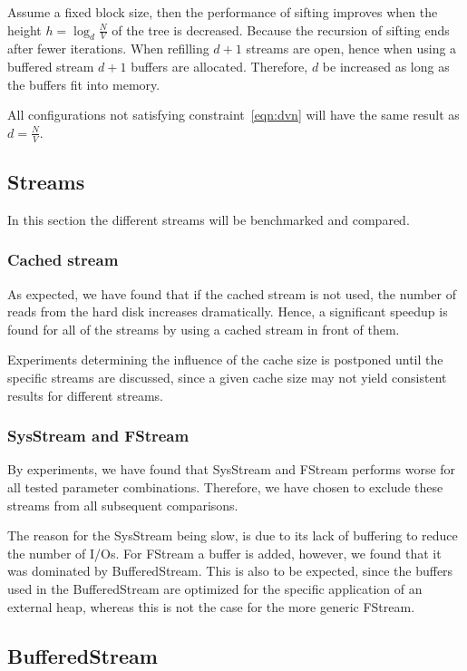 Assume a fixed block size, then the performance of sifting improves when the height $h = \log_d{\frac{N}{V}}$ of the tree is decreased. Because the recursion of sifting ends after fewer iterations. When refilling $d+1$ streams are open, hence when using a buffered stream $d+1$ buffers are allocated. Therefore, $d$ be increased as long as the buffers fit into memory.

All configurations not satisfying constraint~\ref{eqn:dvn} will have the same result as $d=\frac{N}{V}$.

\subsection{Streams}
In this section the different streams will be benchmarked and compared.

\subsubsection{Cached stream}
As expected, we have found that if the cached stream is not used, the number of reads from the hard disk increases dramatically. Hence, a significant speedup is found for all of the streams by using a cached stream in front of them.

Experiments determining the influence of the cache size is postponed until the specific streams are discussed, since a given cache size may not yield consistent results for different streams.

\subsubsection{SysStream and FStream}
By experiments, we have found that SysStream and FStream performs worse for all tested parameter combinations. Therefore, we have chosen to exclude these streams from all subsequent comparisons.

The reason for the SysStream being slow, is due to its lack of buffering to reduce the number of I/Os. For FStream a buffer is added, however, we found that it was dominated by BufferedStream. This is also to be expected, since the buffers used in the BufferedStream are optimized for the specific application of an external heap, whereas this is not the case for the more generic FStream.

\subsection{BufferedStream}

